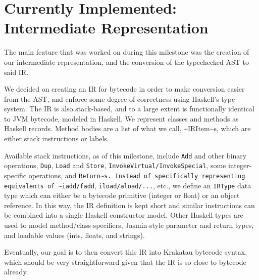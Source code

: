 \documentclass[11pt]{article}
\begin{document}
\section{Currently Implemented: Intermediate Representation}
\label{sec:org67a14b2}
The main feature that was worked on during this milestone was the
creation of our intermediate representation, and the conversion of
the typechecked AST to said IR.

We decided on creating an IR for bytecode in order to make conversion easier
from the AST, and enforce some degree of correctness using Haskell's type
system. The IR is also stack-based, and to a large extent is functionally
identical to JVM bytecode, modeled in Haskell. We represent classes and
methods as Haskell records. Method bodies are a list of what we call,
\textasciitilde{}IRItem\textasciitilde{}s, which are either stack instructions or labels.

Available stack instructions, as of this milestone, include \texttt{Add} and other
binary operations, \texttt{Dup}, \texttt{Load} and \texttt{Store}, \texttt{InvokeVirtual/InvokeSpecial},
some integer-specific operations, and \texttt{Return\textasciitilde{}s. Instead of specifically
  representing equivalents of \textasciitilde{}iadd/fadd}, \texttt{iload/aload/...}, etc., we define
an \texttt{IRType} data type which can either be a bytecode primitive (integer or
float) or an object reference. In this way, the IR definition is kept short
and similar instructions can be combined into a single Haskell constructor
model. Other Haskell types are used to model method/class specifiers,
Jasmin-style parameter and return types, and loadable values (ints, floats,
and strings).

Eventually, our goal is to then convert this IR into Krakatau bytecode syntax,
which should be very straightforward given that the IR is so close to bytecode
already.
\end{document}
